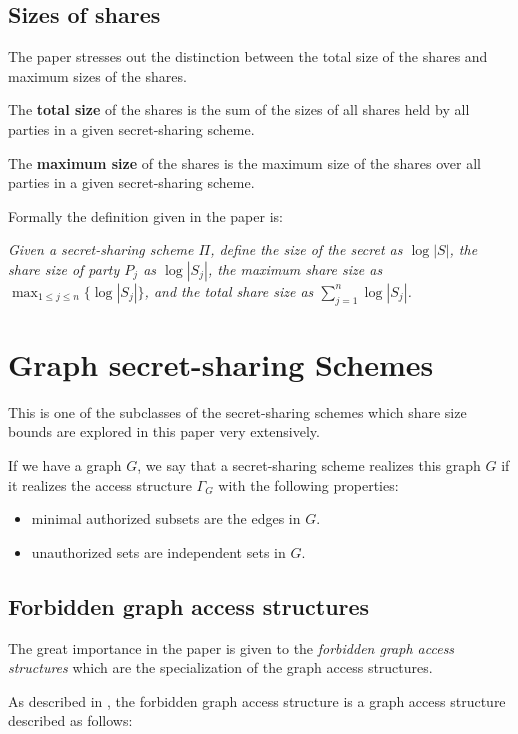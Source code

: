 \subsection{Sizes of shares}

The paper stresses out the distinction between the total size of the shares and maximum sizes of the shares.

The \textbf{total size} of the shares is the sum of the sizes of all shares held by all parties in a given secret-sharing scheme.

The \textbf{maximum size} of the shares is the maximum size of the shares over all parties in a given secret-sharing scheme.

Formally the definition given in the paper is:

\emph{Given a secret-sharing scheme $\Pi$,
define the \emph{size} of the secret as $\log |S|$,
the \emph{share size} of party $P_j$ as $\log |S_j|$,
the \emph{maximum share size} as $\max_{1\le j \le n} \{\log |S_j| \}$,
and the \emph{total share size} as $\sum_{j=1}^{n} \log |S_j|$.
}

\section{Graph secret-sharing Schemes}

This is one of the subclasses of the secret-sharing schemes which share size bounds are explored in this paper very extensively.

If we have a graph $G$, we say that a secret-sharing scheme realizes this graph $G$ if it realizes the access structure $\Gamma_G$ with the following properties:

\begin{itemize}
    \item minimal authorized subsets are the edges in $G$.
    \item unauthorized sets are independent sets in $G$.
\end{itemize}

\subsection{Forbidden graph access structures}

The great importance in the paper is given to the \textit{forbidden graph access structures} which are the specialization of the graph access structures.

As described in \cite{forbiddenGraphAccessStructures}, the forbidden graph access structure is a graph access structure described as follows:

